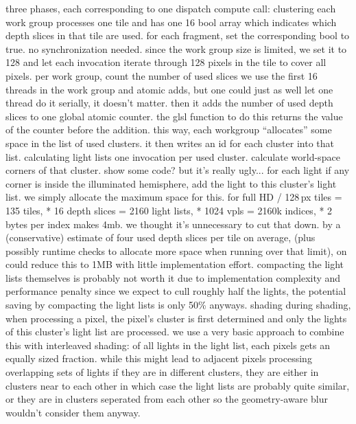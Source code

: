 \begin{outline}
\1 three phases, each corresponding to one dispatch compute call:
\1 clustering
    \2 each work group processes one tile and has one 16 bool array which indicates which depth slices in that tile are used.
    \2 for each fragment, set the corresponding bool to true. no synchronization needed.
    \2 since the work group size is limited, we set it to 128 and let each invocation iterate through 128 pixels in the tile to cover all pixels.
    \2 per work group, count the number of used slices
        \3 we use the first 16 threads in the work group and atomic adds, but one could just as well let one thread do it serially, it doesn't matter.
    \2 then it adds the number of used depth slices to one global atomic counter. the glsl function to do this returns the value of the counter before the addition.
    \2 this way, each workgroup ``allocates'' some space in the list of used clusters. it then writes an id for each cluster into that list.
\1 calculating light lists
    \2 one invocation per used cluster.
    \2 calculate world-space corners of that cluster.
    \2 show some code? but it's really ugly...
    \2 for each light
        \3 if any corner is inside the illuminated hemisphere, add the light to this cluster's light list.
    \2 we simply allocate the maximum space for this.
        \3 for full HD / 128\,px tiles = 135 tiles, * 16 depth slices = 2160 light lists, * 1024 vpls = 2160k indices, * 2 bytes per index makes 4mb.
        \3 we thought it's unnecessary to cut that down.
        \3 by a (conservative) estimate of four used depth slices per tile on average, (plus possibly runtime checks to allocate more space when running over that limit), on could reduce this to 1MB with little implementation effort.
        \3 compacting the light lists themselves is probably not worth it due to implementation complexity and performance penalty
        \3 since we expect to cull roughly half the lights, the potential saving by compacting the light lists is only 50\% anyways.
\1 shading
    \2 during shading, when processing a pixel, the pixel's cluster is first determined and only the lights of this cluster's light list are processed.
    \2 we use a very basic approach to combine this with interleaved shading: of all lights in the light list, each pixels gets an equally sized fraction. while this might lead to adjacent pixels processing overlapping sets of lights if they are in different clusters, they are either in clusters near to each other in which case the light lists are probably quite similar, or they are in clusters seperated from each other so the geometry-aware blur wouldn't consider them anyway.


\end{outline}
